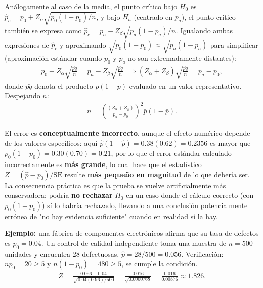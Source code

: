 \begin{solproblema}[prob:451f58f]
	Análogamente al caso de la media, el punto crítico bajo $H_0$ es $\hat p_c = p_0+Z_\alpha\sqrt{p_0(1-p_0)/n}$, y bajo $H_a$ (centrado en $p_a$), el punto crítico también se expresa como $\hat p_c = p_a-Z_\beta\sqrt{p_a(1-p_a)/n}$. Igualando ambas expresiones de $\hat p_c$ y aproximando $\sqrt{p_0(1-p_0)}\approx\sqrt{p_a(1-p_a)}$ para simplificar (aproximación estándar cuando $p_0$ y $p_a$ no son extremadamente distantes):
	\begin{align*}
		p_0+Z_\alpha\sqrt{\frac{\bar{pq}}{n}} = p_a-Z_\beta\sqrt{\frac{\bar{pq}}{n}} \implies (Z_\alpha+Z_\beta)\sqrt{\frac{\bar{pq}}{n}} = p_a-p_0,
	\end{align*}
	donde $\bar{pq}$ denota el producto $p(1-p)$ evaluado en un valor representativo. Despejando $n$:
	\begin{align*}
		n = \left(\frac{(Z_\alpha+Z_\beta)}{p_a-p_0}\right)^2 \bar{p}(1-\bar p).
	\end{align*}
\end{solproblema}

\begin{solproblema}[prob:f016371]
	El error es \textbf{conceptualmente incorrecto}, aunque el efecto numérico depende de los valores específicos: aquí $\hat p(1-\hat p)=0.38(0.62)=0.2356$ es mayor que $p_0(1-p_0)=0.30(0.70)=0.21$, por lo que el error estándar calculado incorrectamente es \textbf{más grande}, lo cual hace que el estadístico $Z=(\hat p-p_0)/\text{SE}$ resulte \textbf{más pequeño en magnitud} de lo que debería ser. La consecuencia práctica es que la prueba se vuelve artificialmente más conservadora: podría \textbf{no rechazar} $H_0$ en un caso donde el cálculo correcto (con $p_0(1-p_0)$) sí lo habría rechazado, llevando a una conclusión potencialmente errónea de "no hay evidencia suficiente" cuando en realidad sí la hay.
\end{solproblema}

\begin{solproblema}[prob:134cb53]
	\textbf{Ejemplo:} una fábrica de componentes electrónicos afirma que su tasa de defectos es $p_0=0.04$. Un control de calidad independiente toma una muestra de $n=500$ unidades y encuentra $28$ defectuosas, $\hat p=28/500=0.056$. Verificación: $np_0=20\ge5$ y $n(1-p_0)=480\ge5$, se cumple la condición.
	\begin{align*}
		Z = \frac{0.056-0.04}{\sqrt{0.04(0.96)/500}} = \frac{0.016}{\sqrt{0.0000768}} = \frac{0.016}{0.00876} \approx1.826.
	\end{align*}
\end{solproblema}
